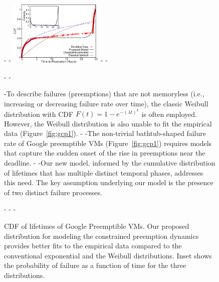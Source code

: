 
 
 \begin{figure}
-  \centering
-  \includegraphics[width=0.4\textwidth]{../graphs/scispot-fig-cdf-prob-inset-time.eps}
-  \vspace*{-0.2cm}
-  \caption{CDF of lifetimes of Google Preemptible VMs. Our proposed distribution for modeling the constrained preemption dynamics provides better fits to the empirical data compared to the conventional exponential and the Weibull distributions. Inset shows the probability of failure as a function of time for the three distributions.}
-  \vspace*{\captionspace}
-


-To describe failures (preemptions) that are not memoryless (i.e., increasing or decreasing failure rate over time), the classic Weibull distribution with CDF $F(t)=1-e^{-(\lambda t)^k}$ is often employed. However, the Weibull distribution is also unable to fit the empirical data (Figure~\ref{fig:gcp1}). 
-
-The non-trivial bathtub-shaped failure rate of Google preemptible VMs (Figure~\ref{fig:gcp1}) requires models that capture the sudden onset of  the rise in preemptions near the deadline. 
-%
-Our new model, informed by the cumulative distribution of lifetimes that has multiple distinct temporal phases, addresses this need. The key assumption underlying our model is the presence of two distinct failure processes.

-%
-%
-%




\end{figure}
